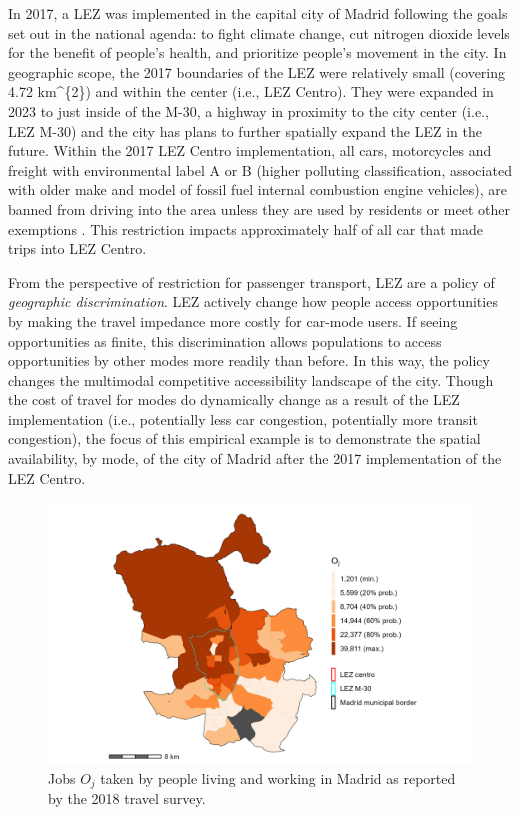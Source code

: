 \documentclass[]{trbunofficial}
\begin{document}
In 2017, a LEZ was implemented in the capital city of Madrid following
the goals set out in the national agenda: to fight climate change, cut
nitrogen dioxide levels for the benefit of people's health, and
prioritize people's movement in the city. In geographic scope, the 2017
boundaries of the LEZ were relatively small (covering 4.72 km\^{}\{2\})
and within the center (i.e., LEZ Centro). They were expanded in 2023 to
just inside of the M-30, a highway in proximity to the city center
(i.e., LEZ M-30) and the city has plans to further spatially expand the
LEZ in the future. Within the 2017 LEZ Centro implementation, all cars,
motorcycles and freight with environmental label A or B (higher
polluting classification, associated with older make and model of fossil
fuel internal combustion engine vehicles), are banned from driving into
the area unless they are used by residents or meet other exemptions
\citep{tarrinoortizAnalyzingImpactLow2022}. This restriction impacts
approximately half of all car that made trips into LEZ Centro.

From the perspective of restriction for passenger transport, LEZ are a
policy of \emph{geographic discrimination}. LEZ actively change how
people access opportunities by making the travel impedance more costly
for car-mode users. If seeing opportunities as finite, this
discrimination allows populations to access opportunities by other modes
more readily than before. In this way, the policy changes the multimodal
competitive accessibility landscape of the city. Though the cost of
travel for modes do dynamically change as a result of the LEZ
implementation (i.e., potentially less car congestion, potentially more
transit congestion), the focus of this empirical example is to
demonstrate the spatial availability, by mode, of the city of Madrid
after the 2017 implementation of the LEZ Centro.

\begin{figure}

{\centering \includegraphics[width=1\linewidth]{images/i_jobs_zn208_plot} 

}

\caption{\label{fig:Fig2} Jobs $O_j$ taken by people living and working in Madrid as reported by the 2018 travel survey.}\label{fig:jobs-plot}
\end{figure}
\end{document}

